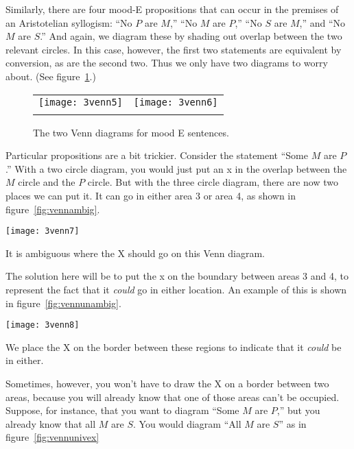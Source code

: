Similarly, there are four mood-E propositions that can occur in the premises of an Aristotelian syllogism: ``No $P$ are $M$,'' ``No $M$ are $P$,'' ``No $S$ are $M$,'' and ``No $M$ are $S$.'' And again, we diagram these by shading out overlap between the two relevant circles. In this case, however, the first two statements are equivalent by conversion, as are the second two. Thus we only have two diagrams to worry about. (See figure~\ref{fig:mood-E_venns}.)

\begin{figure}
\begin{tabu}{X[1,c] X[1,c]}
\texttt{[image: 3venn5]} &
\texttt{[image: 3venn6]} \\
\caption{The two Venn diagrams for mood E sentences.}
\label{fig:mood-E_venns}
\end{tabu}
\end{figure}

Particular propositions are a bit trickier. Consider the statement ``Some $M$ are $P$.'' With a two circle diagram, you would just put an x in the overlap between the $M$ circle and the $P$ circle. But with the three circle diagram, there are now two places we can put it. It can go in either area 3 or area 4, as shown in figure~\ref{fig:vennambig}.

\begin{marginfigure}[-7cm]
\centering
\texttt{[image: 3venn7]}
\caption{It is ambiguous where the X should go on this Venn diagram.}
\label{fig:vennambig}
\end{marginfigure}

The solution here will be to put the x on the boundary between areas 3 and 4, to represent the fact that it \emph{could} go in either location. An example of this is shown in figure~\ref{fig:vennunambig}.

\begin{marginfigure}[-1cm]
\centering
\texttt{[image: 3venn8]}
\caption{We place the X on the border between these regions to indicate that it \emph{could} be in either.}
\label{fig:vennunambig}
\end{marginfigure}

Sometimes, however, you won't have to draw the X on a border between two areas, because you will already know that one of those areas can't be occupied. Suppose, for instance, that you want to diagram ``Some $M$ are $P$,'' but you already know that all $M$ are $S$. You would diagram ``All $M$ are $S$'' as in figure~\ref{fig:vennunivex}

